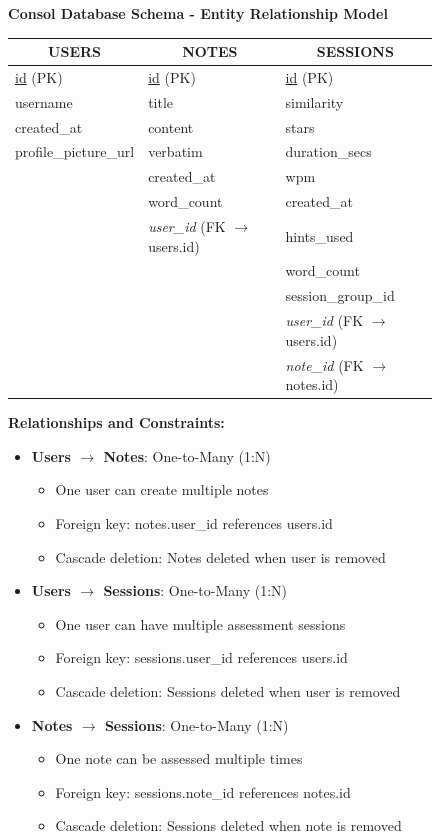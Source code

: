 {{\begin{figure}[H]
\centering
\begin{minipage}{\textwidth}
\centering
\textbf{Consol Database Schema - Entity Relationship Model}
\vspace{0.5cm}

\begin{tabular}{|l|l|l|}
\hline
\multicolumn{1}{|c|}{\textbf{USERS}} & \multicolumn{1}{|c|}{\textbf{NOTES}} & \multicolumn{1}{|c|}{\textbf{SESSIONS}} \\
\hline
\underline{id} (PK) & \underline{id} (PK) & \underline{id} (PK) \\
username & title & similarity \\
created\_at & content & stars \\
profile\_picture\_url & verbatim & duration\_secs \\
 & created\_at & wpm \\
 & word\_count & created\_at \\
 & \textit{user\_id} (FK $\rightarrow$ users.id) & hints\_used \\
 &  & word\_count \\
 &  & session\_group\_id \\
 &  & \textit{user\_id} (FK $\rightarrow$ users.id) \\
 &  & \textit{note\_id} (FK $\rightarrow$ notes.id) \\
\hline
\end{tabular}

\vspace{0.8cm}

\textbf{Relationships and Constraints:}
\begin{itemize}
\item \textbf{Users $\rightarrow$ Notes}: One-to-Many (1:N) 
\begin{itemize}
\item One user can create multiple notes
\item Foreign key: notes.user\_id references users.id
\item Cascade deletion: Notes deleted when user is removed
\end{itemize}
\item \textbf{Users $\rightarrow$ Sessions}: One-to-Many (1:N)
\begin{itemize}
\item One user can have multiple assessment sessions
\item Foreign key: sessions.user\_id references users.id
\item Cascade deletion: Sessions deleted when user is removed
\end{itemize}
\item \textbf{Notes $\rightarrow$ Sessions}: One-to-Many (1:N)
\begin{itemize}
\item One note can be assessed multiple times
\item Foreign key: sessions.note\_id references notes.id
\item Cascade deletion: Sessions deleted when note is removed
\end{itemize}
\end{itemize}


\end{minipage}
\end{figure}}}
